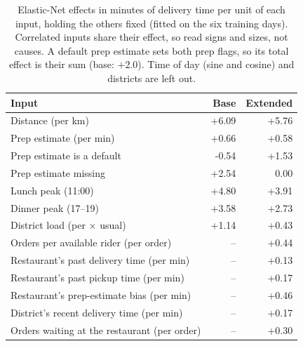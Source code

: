 \begin{table}[t]
\centering
\caption{Elastic-Net effects in minutes of delivery time per unit of each input, holding the others fixed (fitted on the six training days). Correlated inputs share their effect, so read signs and sizes, not causes. A default prep estimate sets both prep flags, so its total effect is their sum (base: $+2.0$). Time of day (sine and cosine) and districts are left out.}
\label{tab:effects}
\small
\begin{tabular}{@{}lrr@{}}
\toprule
Input & Base & Extended \\
\midrule
Distance (per km) & +6.09 & +5.76 \\
Prep estimate (per min) & +0.66 & +0.58 \\
Prep estimate is a default & -0.54 & +1.53 \\
Prep estimate missing & +2.54 & 0.00 \\
Lunch peak (11:00) & +4.80 & +3.91 \\
Dinner peak (17--19) & +3.58 & +2.73 \\
District load (per $\times$ usual) & +1.14 & +0.43 \\
Orders per available rider (per order) & -- & +0.44 \\
Restaurant's past delivery time (per min) & -- & +0.13 \\
Restaurant's past pickup time (per min) & -- & +0.17 \\
Restaurant's prep-estimate bias (per min) & -- & +0.46 \\
District's recent delivery time (per min) & -- & +0.17 \\
Orders waiting at the restaurant (per order) & -- & +0.30 \\
\bottomrule
\end{tabular}
\end{table}

